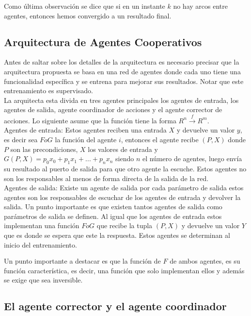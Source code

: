 \documentclass{article}
\begin{document}
        Como última observación se dice que si en un instante $k$ no hay arcos entre agentes, entonces hemos convergido a un resultado final.

    \subsection*{Arquitectura de Agentes Cooperativos}

        Antes de saltar sobre los detalles de la arquitectura es necesario precisar que la arquitectura propuesta se basa en una red de agentes donde cada uno tiene una funcionalidad específica y se entrena para mejorar sus resultados. Notar que este entrenamiento es supervisado. \\

        La arquitecta esta divida en tres agentes principales los agentes de entrada, los agentes de salida, agente coordinador de acciones y el agente corrector de acciones. Lo siguiente asume que la función tiene la forma $R^n \xrightarrow{f} R^m$. \\

        Agentes de entrada: Estos agentes reciben una entrada $X$ y devuelve un valor $y$, es decir sea $FoG$ la función del agente $i$, entonces el agente recibe $(P,X)$ donde $P$ son las precondiciones, $X$ los valores de entrada y
        $G(P,X)=p_0x_0 + p_1x_1 +...+p_nx_n$ siendo $n$ el número de agentes, luego envía su resultado al puerto de salida para que otro agente la escuche. Estos agentes no son los responsables al menos de forma directa de la salida de la red.\\

        Agentes de salida: Existe un agente de salida por cada parámetro de salida estos agentes son los responsables de escuchar de los agentes de entrada y devolver la salida.
        Un punto importante es que existen tantos agentes de salida como parámetros de salida se definen. Al igual que los agentes de entrada estos implementan una función $FoG$ 
        que recibe la tupla $(P,X)$ y devuelve un valor $Y$ que es donde se espera que este la respuesta. Estos agentes se determinan al inicio del entrenamiento.

        Un punto importante a destacar es que la función de $F$ de ambos agentes, es su función característica, es decir, una función que solo implementan ellos y además se exige que sea inversible.

        \subsection*{El agente corrector y el agente coordinador}
\end{document}
